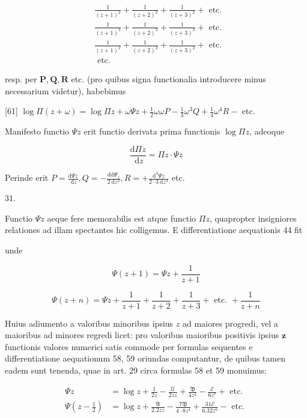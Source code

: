 \documentclass[10pt]{article}
\begin{document}
\[
\begin{aligned}
& \frac{1}{(z+1)^{2}}+\frac{1}{(z+2)^{2}}+\frac{1}{(z+3)^{2}}+\text { etc. } \\
& \frac{1}{(z+1)^{3}}+\frac{1}{(z+2)^{3}}+\frac{1}{(z+3)^{3}}+\text { etc. } \\
& \frac{1}{(z+1)^{2}}+\frac{1}{(z+2)^{2}}+\frac{1}{(z+3)^{2}}+\text { etc. } \\
& \text { etc. }
\end{aligned}
\]

resp. per \(\boldsymbol{P}, \boldsymbol{Q}, \boldsymbol{R}\) etc. (pro quibus signa functionalia introducere minus necessarium videtur), habebimus

[61] \(\log \Pi(z+\omega)=\log \Pi z+\omega \Psi z+\frac{1}{2} \omega \omega P-\frac{1}{3} \omega^{3} Q+\frac{1}{4} \omega^{4} R-\) etc.

Manifesto functio \(\Psi z\) erit functio derivata prima functionis \(\log \Pi z\), adeoque

\[
\frac{\mathrm{d} \Pi z}{\mathrm{~d} z}=\Pi z \cdot \Psi z
\]

Perinde erit \(P=\frac{\mathrm{d} \Psi z}{\mathrm{~d} z}, Q=-\frac{\mathrm{dd} \Psi_{z}}{2 \mathrm{~d} z^{2}}, R=+\frac{\mathrm{d}^{3} \Psi z}{2 \cdot 3 \mathrm{~d} z^{3}}\) etc.

31.

Functio \(\Psi z\) aeque fere memorabilis est atque functio \(\Pi z\), quapropter insigniores relationes ad illam spectantes hic colligemus. E differentiatione aequationis 44 fit

unde

\[
\Psi(z+1)=\Psi z+\frac{1}{z+1}
\]

\[
\Psi(z+n)=\Psi z+\frac{1}{z+1}+\frac{1}{z+2}+\frac{1}{z+3}+\text { etc. }+\frac{1}{z+n}
\]

Huius adiumento a valoribus minoribus ipsius \(z\) ad maiores progredi, vel a maioribus ad minores regredi licet: pro valoribus maioribus positivis ipsius \(\boldsymbol{z}\) functionis valores numerici satis commode per formulas sequentes e differentiatione aequationum 58, 59 oriundas computantur, de quibus tamen eadem sunt tenenda, quae in art. 29 circa formulas 58 et 59 monuimus:

\[
\begin{aligned}
\Psi z & =\log z+\frac{1}{2 z}-\frac{\mathscr{U}}{2 z z}+\frac{\mathfrak{B}}{4 z^{2}}-\frac{\mathscr{E}}{6 z^{\mathrm{e}}}+\text { etc. } \\
\Psi\left(z-\frac{1}{2}\right) & =\log z+\frac{\mathfrak{A}}{2.2 z z}-\frac{7 \mathfrak{B}}{4 \cdot 8 z^{4}}+\frac{31 \mathcal{E}}{6.32 z^{6}}-\text { etc. }
\end{aligned}
\]
\end{document}
